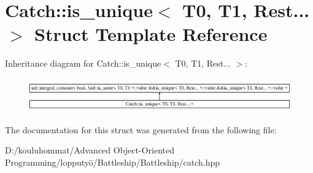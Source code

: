 \hypertarget{struct_catch_1_1is__unique_3_01_t0_00_01_t1_00_01_rest_8_8_8_01_4}{}\section{Catch\+:\+:is\+\_\+unique$<$ T0, T1, Rest... $>$ Struct Template Reference}
\label{struct_catch_1_1is__unique_3_01_t0_00_01_t1_00_01_rest_8_8_8_01_4}
Inheritance diagram for Catch\+:\+:is\+\_\+unique$<$ T0, T1, Rest... $>$\+:\begin{figure}[H]
\begin{center}
\leavevmode
\includegraphics[height=1.483444cm]{struct_catch_1_1is__unique_3_01_t0_00_01_t1_00_01_rest_8_8_8_01_4}
\end{center}
\end{figure}


The documentation for this struct was generated from the following file\+:\begin{DoxyCompactItemize}
\item 
D\+:/kouluhommat/\+Advanced Object-\/\+Oriented Programming/lopputyö/\+Battleship/\+Battleship/catch.\+hpp\end{DoxyCompactItemize}
